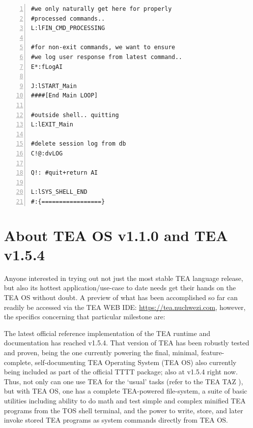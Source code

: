 \documentclass{article}
\begin{document}
{\begin{lstlisting}[style=tea,caption=TEA Program: TOS v1.1.0 Complete Source-Code, label=LST3,breaklines=true,numbers=left]
#we only naturally get here for properly 
#processed commands..
L:lFIN_CMD_PROCESSING

#for non-exit commands, we want to ensure 
#we log user response from latest command..
E*:fLogAI

J:lSTART_Main
####[End Main LOOP]

#outside shell.. quitting
L:lEXIT_Main 

#delete session log from db
C!@:dvLOG 

Q!: #quit+return AI

L:lSYS_SHELL_END
#:{=================}
   \end{lstlisting}
}


\section{About TEA OS v1.1.0 and TEA v1.5.4}
\label{SECTOSIntro}

Anyone interested in trying out not just the most stable TEA language release, but also its hottest application/use-case to date needs get their hands on the TEA OS without doubt. A preview of what has been accomplished so far can readily be accessed via the TEA WEB IDE: \url{https://tea.nuchwezi.com}, however, the specifics concerning that particular milestone are: 

The latest official reference implementation of the TEA runtime and documentation has reached v1.5.4. That version of TEA has been robustly tested and proven, being the one currently powering the final, minimal, feature-complete, self-documenting TEA Operating System (TEA OS) also currently being included as part of the official TTTT package; also at v1.5.4 right now. Thus, not only can one use TEA for the `usual' tasks (refer to the TEA TAZ \cite{Lutalo2024TEATAZ}), but with TEA OS, one has a complete TEA-powered file-system, a suite of basic utilities including ability to do math and test simple and complex minified TEA programs from the TOS shell terminal, and the power to write, store, and later invoke stored TEA programs as system commands directly from TEA OS. 
\end{document}

